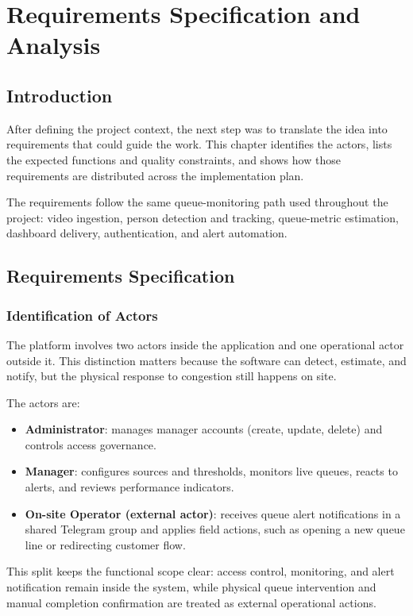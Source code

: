 \chapter{Requirements Specification and Analysis}
\chaptertoc

\clearpage

\section{Introduction}
After defining the project context, the next step was to translate the idea into requirements that could guide the work. This chapter identifies the actors, lists the expected functions and quality constraints, and shows how those requirements are distributed across the implementation plan.

The requirements follow the same queue-monitoring path used throughout the project: video ingestion, person detection and tracking, queue-metric estimation, dashboard delivery, authentication, and alert automation.

\section{Requirements Specification}

\subsection{Identification of Actors}
The platform involves two actors inside the application and one operational actor outside it. This distinction matters because the software can detect, estimate, and notify, but the physical response to congestion still happens on site.

The actors are:
\begin{itemize}
    \item \textbf{Administrator}: manages manager accounts (create, update, delete) and controls access governance.
    \item \textbf{Manager}: configures sources and thresholds, monitors live queues, reacts to alerts, and reviews performance indicators.
    \item \textbf{On-site Operator (external actor)}: receives queue alert notifications in a shared Telegram group and applies field actions, such as opening a new queue line or redirecting customer flow.
\end{itemize}

This split keeps the functional scope clear: access control, monitoring, and alert notification remain inside the system, while physical queue intervention and manual completion confirmation are treated as external operational actions.

